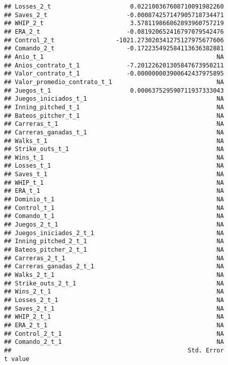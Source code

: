 \documentclass[
]{article}
\begin{document}
\begin{verbatim}
## Losses_2_t                      0.022100367608710091982260
## Saves_2_t                      -0.000874257147905718734471
## WHIP_2_t                        3.578119866862893960757219
## ERA_2_t                        -0.081920652416797079542476
## Control_2_t                 -1021.273020341275127975677606
## Comando_2_t                    -0.172235492584113636382881
## Anio_t_1                                                NA
## Anios_contrato_t_1             -7.201226201305847673950211
## Valor_contrato_t_1             -0.000000003900642437975895
## Valor_promedio_contrato_t_1                             NA
## Juegos_t_1                      0.000637529590711937333043
## Juegos_iniciados_t_1                                    NA
## Inning_pitched_t_1                                      NA
## Bateos_pitcher_t_1                                      NA
## Carreras_t_1                                            NA
## Carreras_ganadas_t_1                                    NA
## Walks_t_1                                               NA
## Strike_outs_t_1                                         NA
## Wins_t_1                                                NA
## Losses_t_1                                              NA
## Saves_t_1                                               NA
## WHIP_t_1                                                NA
## ERA_t_1                                                 NA
## Dominio_t_1                                             NA
## Control_t_1                                             NA
## Comando_t_1                                             NA
## Juegos_2_t_1                                            NA
## Juegos_iniciados_2_t_1                                  NA
## Inning_pitched_2_t_1                                    NA
## Bateos_pitcher_2_t_1                                    NA
## Carreras_2_t_1                                          NA
## Carreras_ganadas_2_t_1                                  NA
## Walks_2_t_1                                             NA
## Strike_outs_2_t_1                                       NA
## Wins_2_t_1                                              NA
## Losses_2_t_1                                            NA
## Saves_2_t_1                                             NA
## WHIP_2_t_1                                              NA
## ERA_2_t_1                                               NA
## Control_2_t_1                                           NA
## Comando_2_t_1                                           NA
##                                                 Std. Error         t value

\end{verbatim}
\end{document}
